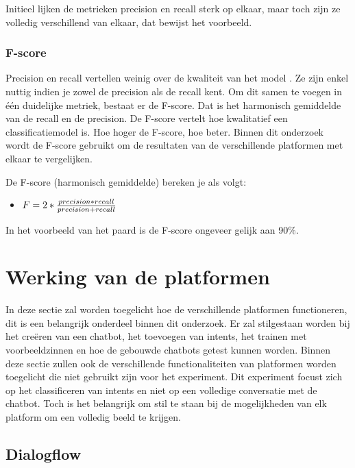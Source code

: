 Initieel lijken de metrieken precision en recall sterk op elkaar, maar toch zijn ze volledig verschillend van elkaar, dat bewijst het voorbeeld.

\subsubsection{F-score}

Precision en recall vertellen weinig over de kwaliteit van het model \autocite{Treml2019}. Ze zijn enkel nuttig indien je zowel de precision als de recall kent. Om dit samen te voegen in één duidelijke metriek, bestaat er de F-score. Dat is het harmonisch gemiddelde van de recall en de precision. De F-score vertelt hoe kwalitatief een classificatiemodel is. Hoe hoger de F-score, hoe beter. Binnen dit onderzoek wordt de F-score gebruikt om de resultaten van de verschillende platformen met elkaar te vergelijken.

De F-score (harmonisch gemiddelde) bereken je als volgt:
\begin{itemize}
    \item $F= 2 * \frac{precision*recall}{precision+recall}\\$
\end{itemize}

In het voorbeeld van het paard is de F-score ongeveer gelijk aan 90\%.


\section{Werking van de platformen}
\label{sec:werking-platformen}


In deze sectie zal worden toegelicht hoe de verschillende platformen functioneren, dit is een belangrijk onderdeel binnen dit onderzoek. Er zal stilgestaan worden bij het creëren van een chatbot, het toevoegen van intents, het trainen met voorbeeldzinnen en hoe de gebouwde chatbots getest kunnen worden. Binnen deze sectie zullen ook de verschillende functionaliteiten van platformen worden toegelicht die niet gebruikt zijn voor het experiment. Dit experiment focust zich op het classificeren van intents en niet op een volledige conversatie met de chatbot. Toch is het belangrijk om stil te staan bij de mogelijkheden van elk platform om een volledig beeld te krijgen.

\subsection{Dialogflow}
\label{subsec:werking-platformen-dialogflow}

